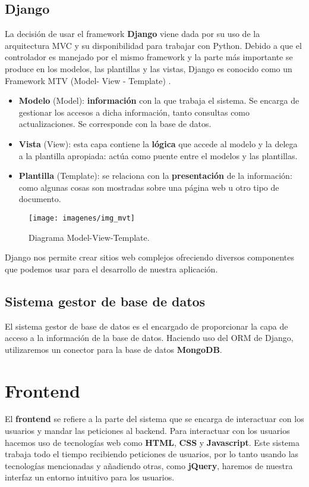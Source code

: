 \subsection{Django}
La decisión de usar el framework \textbf{Django} viene dada por su uso de la arquitectura MVC y su disponibilidad para trabajar con Python. Debido a que el controlador es manejado por el mismo framework y la parte más importante se produce en los modelos, las plantillas y las vistas, Django es conocido como un Framework MTV (Model- View - Template) \cite{cita_mvt}.
\begin{itemize}
	\item \textbf{Modelo} (Model): \textbf{información} con la que trabaja el sistema. Se encarga de gestionar los accesos a dicha información, tanto consultas como actualizaciones. Se corresponde con la base de datos.
	\item \textbf{Vista} (View): esta capa contiene la \textbf{lógica} que accede al modelo y la delega a la plantilla apropiada: actúa como puente entre el modelos y las plantillas.
	\item \textbf{Plantilla} (Template): se relaciona con la \textbf{presentación} de la información: como algunas cosas son mostradas sobre una página web u otro tipo de documento. \\
\end{itemize}

\begin{figure}[H]
	\centering
	\texttt{[image: imagenes/img\_mvt]}
	\caption{Diagrama Model-View-Template.}
	\label{fig:img_mvt}
\end{figure}

Django nos permite crear sitios web complejos ofreciendo diversos componentes que podemos usar para el desarrollo de nuestra aplicación.

\subsection{Sistema gestor de base de datos}
El sistema gestor de base de datos es el encargado de proporcionar la capa de acceso a la información de la base de datos. Haciendo uso del ORM de Django, utilizaremos un conector para la base de datos \textbf{MongoDB}.

\section{Frontend}
El \textbf{frontend} se refiere a la parte del sistema que se encarga de interactuar con los usuarios y mandar las peticiones al backend. Para interactuar con los usuarios hacemos uso de tecnologías web como \textbf{HTML}, \textbf{CSS} y \textbf{Javascript}. Este sistema trabaja todo el tiempo recibiendo peticiones de usuarios, por lo tanto usando las tecnologías mencionadas y añadiendo otras, como \textbf{jQuery}, haremos de nuestra interfaz un entorno intuitivo para los usuarios. \\

